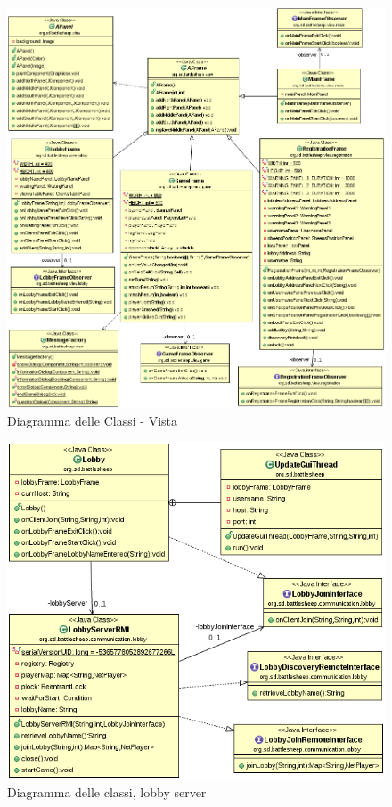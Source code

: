 \documentclass[a4paper,10pt]{scrartcl}
\begin{document}
\begin{figure}[!h]
	\centering
	\includegraphics[scale=0.4]{core/imgs/UML/VistaBellaUML.png}
	\caption{Diagramma delle Classi - Vista}
	\label{figure:class_diagram_view}
\end{figure}


\begin{figure}[!ht]
    \centering
\includegraphics[width=1.0\textwidth]{core/imgs/UML/LobbyCommunicationUML.png}
    \caption{Diagramma delle classi, lobby server}
    \label{fig:classlobby}
\end{figure}
\end{document}
